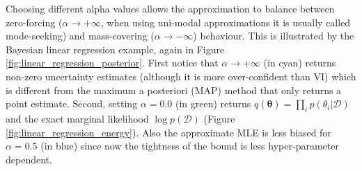 %
Choosing different alpha values allows the approximation to balance between zero-forcing ($\alpha \rightarrow +\infty$, when using uni-modal approximations it is usually called mode-seeking) and mass-covering ($\alpha \rightarrow -\infty$) behaviour. This is illustrated by the Bayesian linear regression example, again in Figure \ref{fig:linear_regression_posterior}. First notice that $\alpha \rightarrow +\infty$ (in cyan) returns non-zero uncertainty estimates (although it is more over-confident than VI) which is different from the maximum a posteriori (MAP) method that only returns a point estimate. Second, setting $\alpha = 0.0$ (in green) returns $q(\bm{\theta}) = \prod_i p(\theta_i|\mathcal{D})$ and the exact marginal likelihood $\log p(\mathcal{D})$ (Figure \ref{fig:linear_regression_energy}). Also the approximate MLE is less biased for $\alpha = 0.5$ (in blue) since now the tightness of the bound is less hyper-parameter dependent.